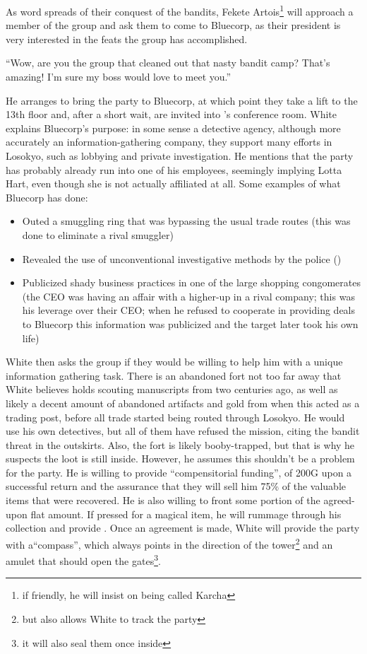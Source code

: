  As word spreads of their conquest of the bandits, Fekete Artois\footnote{if friendly, he will insist on being called Karcha} will approach a member of the group and ask them to come to Bluecorp, as their president is very interested in the feats the group has accomplished.\\
\begin{center}
``Wow, are you the group that cleaned out that nasty bandit camp? That's amazing! I'm sure my boss would love to meet you.''
\end{center}
He arranges to bring the party to Bluecorp, at which point they take a lift to the 13th floor and, after a short wait, are invited into 's conference room. White explains Bluecorp's purpose: in some sense a detective agency, although more accurately an information-gathering company, they support many efforts in Losokyo, such as lobbying and private investigation. He mentions that the party has probably already run into one of his employees, seemingly implying Lotta Hart, even though she is not actually affiliated at all. Some examples of what Bluecorp has done:
\begin{itemize}
\item Outed a smuggling ring that was bypassing the usual trade routes (this was done to eliminate a rival smuggler)
\item Revealed the use of unconventional investigative methods by the police ()
\item Publicized shady business practices in one of the large shopping congomerates (the CEO was having an affair with a higher-up in a rival company; this was his leverage over their CEO; when he refused to cooperate in providing deals to Bluecorp this information was publicized and the target later took his own life)
\end{itemize}
White then asks the group if they would be willing to help him with a unique information gathering task. There is an abandoned fort not too far away that White believes holds scouting manuscripts from two centuries ago, as well as likely a decent amount of abandoned artifacts and gold from when this acted as a trading post, before all trade started being routed through Losokyo. He would use his own detectives, but all of them have refused the mission, citing the bandit threat in the outskirts. Also, the fort is likely booby-trapped, but that is why he suspects the loot is still inside. However, he assumes this shouldn't be a problem for the party. He is willing to provide ``compensitorial funding'', of 200G upon a successful return and the assurance that they will sell him 75\% of the valuable items that were recovered. He is also willing to front some portion of the agreed-upon flat amount. If pressed for a magical item, he will rummage through his collection and provide . Once an agreement is made, White will provide the party with a``compass'', which always points in the direction of the tower\footnote{but also allows White to track the party} and an amulet that should open the gates\footnote{it will also seal them once inside}. \\
